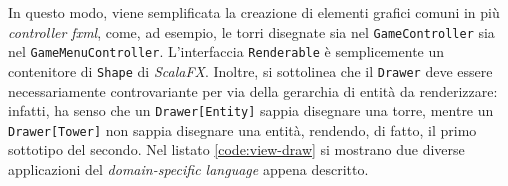 

In questo modo, viene semplificata la creazione di elementi grafici comuni in più \textit{controller fxml}, come, ad
esempio, le torri disegnate sia nel \texttt{GameController} sia nel \texttt{GameMenuController}. L'interfaccia
\texttt{Renderable} è semplicemente un contenitore di \texttt{Shape} di \textit{ScalaFX}. Inoltre, si sottolinea che il
\texttt{Drawer} deve essere necessariamente controvariante per via della gerarchia di entità da renderizzare: infatti,
ha senso che un \texttt{Drawer[Entity]} sappia disegnare una torre, mentre un \texttt{Drawer[Tower]} non sappia
disegnare una entità, rendendo, di fatto, il primo sottotipo del secondo. Nel listato \ref{code:view-draw} si mostrano
due diverse applicazioni del \textit{domain-specific language} appena descritto.




